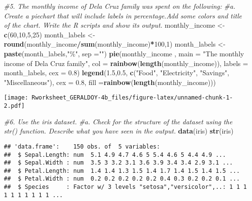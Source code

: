 \documentclass[
]{article}
\newenvironment{Shaded}{\begin{snugshade}}{\end{snugshade}}
\newcommand{\AttributeTok}[1]{\textcolor[rgb]{0.13,0.29,0.53}{#1}}
\newcommand{\CommentTok}[1]{\textcolor[rgb]{0.56,0.35,0.01}{\textit{#1}}}
\newcommand{\DecValTok}[1]{\textcolor[rgb]{0.00,0.00,0.81}{#1}}
\newcommand{\FloatTok}[1]{\textcolor[rgb]{0.00,0.00,0.81}{#1}}
\newcommand{\FunctionTok}[1]{\textcolor[rgb]{0.13,0.29,0.53}{\textbf{#1}}}
\newcommand{\NormalTok}[1]{#1}
\newcommand{\OtherTok}[1]{\textcolor[rgb]{0.56,0.35,0.01}{#1}}
\newcommand{\SpecialCharTok}[1]{\textcolor[rgb]{0.81,0.36,0.00}{\textbf{#1}}}
\newcommand{\StringTok}[1]{\textcolor[rgb]{0.31,0.60,0.02}{#1}}
\begin{document}
\begin{Shaded}
\begin{Highlighting}[]
\CommentTok{\#5. The monthly income of Dela Cruz family was spent on the following:}
\CommentTok{\#a. Create a piechart that will include labels in percentage.Add some colors and title of the chart. Write the R scripts and show its output.}
\NormalTok{monthly\_income }\OtherTok{\textless{}{-}} \FunctionTok{c}\NormalTok{(}\DecValTok{60}\NormalTok{,}\DecValTok{10}\NormalTok{,}\DecValTok{5}\NormalTok{,}\DecValTok{25}\NormalTok{)}
\NormalTok{month\_labels }\OtherTok{\textless{}{-}} \FunctionTok{round}\NormalTok{(monthly\_income}\SpecialCharTok{/}\FunctionTok{sum}\NormalTok{(monthly\_income)}\SpecialCharTok{*}\DecValTok{100}\NormalTok{,}\DecValTok{1}\NormalTok{)}
\NormalTok{month\_labels }\OtherTok{\textless{}{-}} \FunctionTok{paste}\NormalTok{(month\_labels,}\StringTok{"\%"}\NormalTok{, }\AttributeTok{sep =}\StringTok{""}\NormalTok{)}
\FunctionTok{pie}\NormalTok{(monthly\_income , }\AttributeTok{main =} \StringTok{"The monthly income of Dela Cruz family"}\NormalTok{, }\AttributeTok{col =} \FunctionTok{rainbow}\NormalTok{(}\FunctionTok{length}\NormalTok{(monthly\_income)), }\AttributeTok{labels =}\NormalTok{ month\_labels, }\AttributeTok{cex =} \FloatTok{0.8}\NormalTok{)}
\FunctionTok{legend}\NormalTok{(}\FloatTok{1.5}\NormalTok{,}\FloatTok{0.5}\NormalTok{, }\FunctionTok{c}\NormalTok{(}\StringTok{"Food"}\NormalTok{, }\StringTok{"Electricity"}\NormalTok{, }\StringTok{"Savings"}\NormalTok{, }\StringTok{"Miscellaneous"}\NormalTok{), }\AttributeTok{cex =} \FloatTok{0.8}\NormalTok{, }\AttributeTok{fill =}\FunctionTok{rainbow}\NormalTok{(}\FunctionTok{length}\NormalTok{(monthly\_income)))}
\end{Highlighting}
\end{Shaded}

\texttt{[image: Rworksheet\_GERALDOY-4b\_files/figure-latex/unnamed-chunk-1-2.pdf]}

\begin{Shaded}
\begin{Highlighting}[]
\CommentTok{\#6. Use the iris dataset.}
\CommentTok{\#a. Check for the structure of the dataset using the str() function. Describe what you have seen in the output.}
\FunctionTok{data}\NormalTok{(iris)}
\FunctionTok{str}\NormalTok{(iris)}
\end{Highlighting}
\end{Shaded}

\begin{verbatim}
## 'data.frame':    150 obs. of  5 variables:
##  $ Sepal.Length: num  5.1 4.9 4.7 4.6 5 5.4 4.6 5 4.4 4.9 ...
##  $ Sepal.Width : num  3.5 3 3.2 3.1 3.6 3.9 3.4 3.4 2.9 3.1 ...
##  $ Petal.Length: num  1.4 1.4 1.3 1.5 1.4 1.7 1.4 1.5 1.4 1.5 ...
##  $ Petal.Width : num  0.2 0.2 0.2 0.2 0.2 0.4 0.3 0.2 0.2 0.1 ...
##  $ Species     : Factor w/ 3 levels "setosa","versicolor",..: 1 1 1 1 1 1 1 1 1 1 ...
\end{verbatim}
\end{document}
